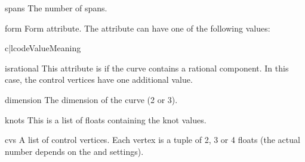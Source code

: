 \begin{memberdesc}{spans}
The number of spans.
\end{memberdesc}

\begin{memberdesc}{form}
Form attribute. The attribute can have one of the following values:

\begin{tableii}{c|l}{code}{Value}{Meaning}
\end{tableii}
\end{memberdesc}

\begin{memberdesc}{isrational}
This attribute is  if the curve contains a rational component.
In this case, the control vertices have one additional value.
\end{memberdesc}

\begin{memberdesc}{dimension}
The dimension of the curve (2 or 3).
\end{memberdesc}

\begin{memberdesc}{knots}
This is a list of floats containing the knot values.
\end{memberdesc}

\begin{memberdesc}{cvs}
A list of control vertices. Each vertex is a tuple of 2, 3 or 4 floats
(the actual number depends on the  and 
settings).
\end{memberdesc}
